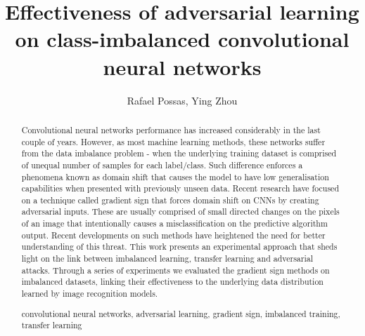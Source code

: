 \documentclass[runningheads,a4paper]{llncs}
\newcommand{\keywords}[1]{\par\addvspace\baselineskip
\noindent\keywordname\enspace\ignorespaces#1}
\begin{document}
\mainmatter  %

\title{Effectiveness of adversarial learning on class-imbalanced convolutional neural networks}

%
%
\author{Rafael Possas, Ying Zhou}
%


%
%

\maketitle


\begin{abstract}
Convolutional neural networks performance has increased considerably in the last couple of years. However, as most machine learning methods, these networks suffer from the data imbalance problem - when the underlying training dataset is comprised of unequal number of samples for each label/class. Such difference enforces a phenomena known as domain shift that causes the model to have low generalisation capabilities when presented with previously unseen data. Recent research have focused on a technique called gradient sign that forces domain shift on CNNs by creating adversarial inputs. These are usually comprised of small directed changes on the pixels of an image that intentionally causes a misclassification on the predictive algorithm output. Recent developments on such methods have heightened the need for better understanding of this threat. This work presents an experimental approach that sheds light on the link between imbalanced learning, transfer learning and adversarial attacks. Through a series of experiments we evaluated the gradient sign methods on imbalanced datasets, linking their effectiveness to the underlying data distribution learned by image recognition models.
\keywords{convolutional neural networks, adversarial learning, gradient sign, imbalanced training, transfer learning}
\end{abstract}
\end{document}
